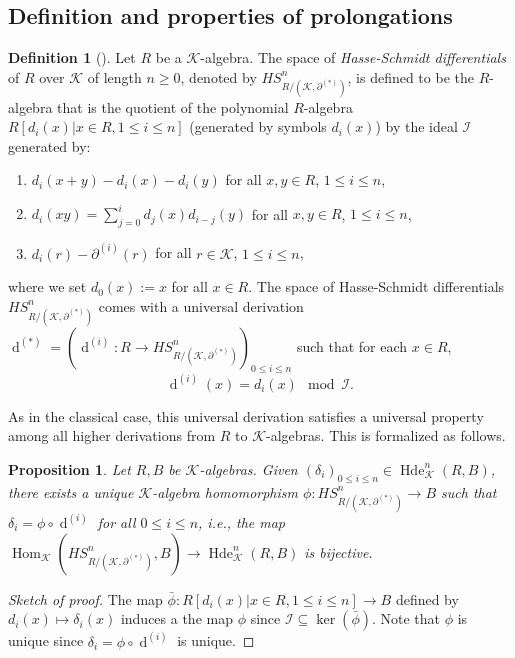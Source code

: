 \documentclass[10pt,a4paper]{amsart}
\theoremstyle{plain} %
\newtheorem{Proposition}[Theorem]{Proposition}
\theoremstyle{definition}
\newtheorem{Definition}[Theorem]{Definition}
\theoremstyle{remark}
\newcommand{\cK}{\mathcal{K}}   %
\newcommand{\Hom}{\operatorname{Hom}}
\newcommand{\Ker}{\operatorname{ker}}
\newcommand{\Hde}{\operatorname{Hde}}
\newcommand{\hd}[2]{\partial^{(#1)}\!\!\left(#2\right)} %
\newcommand{\hde}[1]{\partial^{(#1)}}  %
\newcommand{\hdiff}[2]{\operatorname{d}^{(#1)}\left(#2\right)} %
\newcommand{\hdiffe}[1]{\operatorname{d}^{(#1)}} %
\numberwithin{equation}{subsection}
\begin{document}
\subsection{Definition and properties of prolongations}



\begin{Definition}[{\cite[Def.~1.9]{er:pda}}]
	Let $R$ be a $\cK$-algebra. The space of \emph{Hasse-Schmidt differentials} of $R$ over $\cK$ of length $n \geq 0$, denoted by 
	$HS^n_{R/(\cK,\hde{*})}$, is defined to be the $R$-algebra that is the quotient of the  polynomial $R$-algebra $R[d_i(x) | x\in R, 1\leq i\leq n]$ (generated by symbols $d_i(x)$) by the ideal $\mathcal{I}$ generated by:
	\begin{enumerate}
		\item[(a)] $d_i(x+y)-d_i(x)-d_i(y)$ for all $x,y\in R$, $1\leq i\leq n$,
		\item[(b)] $d_i(xy) =\sum_{j=0}^i d_j(x) d_{i-j}(y)$ for all $x,y\in R$, $1\leq i\leq n$,
		\item[(c)] $d_i(r)-\hd{i}{r}$ for all $r\in \cK$, $1\leq i\leq n$,
	\end{enumerate}
	where we set $d_0(x):=x$ for all $x\in R$. The space of Hasse-Schmidt differentials $HS^n_{R/(\cK,\hde{*})}$ comes with a universal derivation
	$\hdiffe{*}=(\hdiffe{i}:R\to HS^n_{R/(\cK,\hde{*})})_{0\leq i\leq n}$ such that for each $x\in R$,
	\[   \hdiff{i}{x}=d_i(x) \mod \mathcal{I}. \]
 \end{Definition}

    As in the classical case, this universal derivation satisfies a universal property among all higher derivations from $R$ to $\cK$-algebras.
    This is formalized as follows.

     \begin{Proposition}\cite[Prop.~1.18]{er:pda} \label{prop:er-prop.1.18}
     Let $R, B$ be $\cK$-algebras. Given $(\delta_i)_{0\leq i \leq n} \in \Hde_\cK^n(R,B)$, there exists a unique $\cK$-algebra homomorphism $ \phi: HS^n_{R/(\cK,\hde{*})} \rightarrow B$  such that $\delta_i = \phi \circ \hdiffe{i}$ for all $0\leq i\leq n$, i.e., the map $\Hom_\cK(HS^n_{R/(\cK,\hde{*})}, B) \rightarrow \Hde_\cK^n(R,B)$ is bijective. 
 \end{Proposition}

 \begin{proof}[Sketch of proof]
 The map $\bar{\phi}: R[d_i(x) | x\in R, 1\leq i\leq n] \rightarrow B$ defined by $d_i(x) \mapsto \delta_i(x)$ induces a the map $\phi$ since $\mathcal{I} \subseteq \Ker(\bar{\phi})$. Note that $\phi$ is unique since $\delta_i = \phi \circ \hdiffe{i}$ is unique. 
 \end{proof}
    
\end{document}
